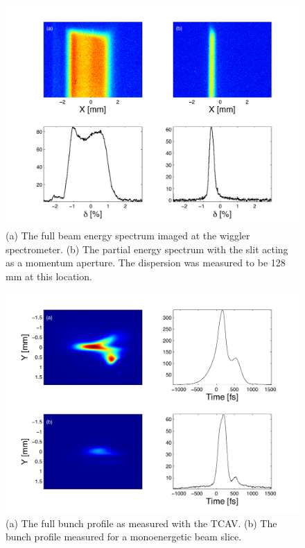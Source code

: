 \documentclass[%
twocolumn,
showpacs,preprintnumbers,
 aps,
prstab,
]{revtex4-1}
\begin{document}
\begin{figure}[hbt]
  \includegraphics[width=\columnwidth]{figures/slit_wlabel.pdf}
  \caption{(a) The full beam energy spectrum imaged at the wiggler spectrometer. (b) The partial energy spectrum with the slit acting as a momentum aperture. The dispersion was measured to be 128 mm at this location.}
  \label{slit}
\end{figure}

\begin{figure}[hbt]
  \includegraphics[width=\columnwidth]{figures/tcav_slit2.pdf}
  \caption{(a) The full bunch profile as measured with the TCAV. (b) The bunch profile measured for a monoenergetic beam slice.}
  \label{tcav_slit}
\end{figure}
\end{document}
